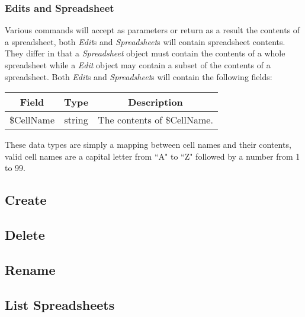 \subsubsection{Edits and Spreadsheet}
\label{sec:message:edits}
\label{sec:message:spreadsheet}

Various commands will accept as parameters or return as a result the contents of a spreadsheet,
both \emph{Edit}s and \emph{Spreadsheet}s will contain spreadsheet contents. They differ in that
a \emph{Spreadsheet} object must contain the contents of a whole spreadsheet while a \emph{Edit}
object may contain a subset of the contents of a spreadsheet. Both \emph{Edit}s and \emph{Spreadsheet}s
will contain the following fields:

\begin{table}[H]
    \begin{center}
        \begin{tabular}{|c|c|c|}\hline
            Field & Type & Description \\\hline
            \$CellName & string & The contents of \$CellName. \\\hline
        \end{tabular}
    \end{center}
\end{table}

These data types are simply a mapping between cell names and their contents, valid cell names are a
capital letter from ``A" to ``Z" followed by a number from 1 to 99.

\subsection{Create}
\label{sec:message:create}


\subsection{Delete}
\label{sec:message:delete}


\subsection{Rename}
\label{sec:message:rename}


\subsection{List Spreadsheets}
\label{sec:message:list}


